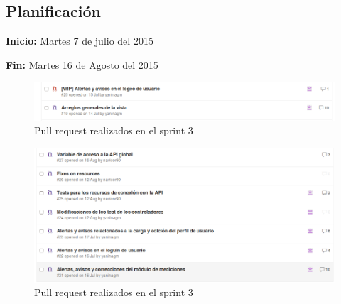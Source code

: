 \documentclass[a4paper,12pt]{article}
\begin{document}
\subsection{Planificación}

\textbf{Inicio: }Martes 7 de julio del 2015 

\textbf{Fin:} Martes 16 de Agosto del 2015

\begin{figure}[h!]
  \centering
  \includegraphics[width=.8\textwidth]{img/3-PR_1_front}
  \caption{Pull request realizados en el sprint  3}
  \label{pull_request_sprint_3}
\end{figure}
\begin{figure}[h!]
  \centering
  \includegraphics[width=.8\textwidth]{img/3-PR_2_front}
  \caption{Pull request realizados en el sprint  3}
  \label{3-PR_back}
\end{figure}
\end{document}
